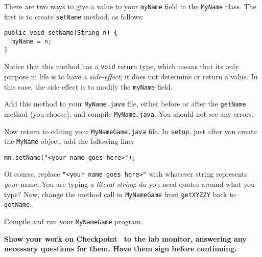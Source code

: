\documentclass[12pt,twoside]{memoir}
\newcommand\code[1]{\lstinline^#1^}
\newenvironment{Checkpoint}[1]{%
\begin{Exercise}[name={Checkpoint},title={#1}]}{%
\end{Exercise}%
\textbf{Show your work on Checkpoint~\theExercise{} to the lab monitor, %
  answering any necessary questions for them.  Have them sign before continuing.}}
\begin{document}
\begin{Checkpoint}{Setting your name.}
  There are two ways to give a value to your \code{myName} field in
  the \code{MyName} class.  The first is to create \code{setName}
  method, as follows:

\begin{lstlisting}
public void setName(String n) {
  myName = n;
}
\end{lstlisting}

Notice that this method has a \code{void} return type, which means
that its only purpose in life is to have a \emph{side-effect}; it does
not determine or return a value.  In this case, the side-effect is to
modify the \code{myName} field.

Add this method to your \code{MyName.java} file, either before or
after the \code{getName} method (you choose), and compile 
\code{MyName.java}.  You should not see any errors.

Now return to editing your \code{MyNameGame.java} file.  In
\code{setup}, just after you create the \code{MyName} object, add the
following line:

\begin{lstlisting}
mn.setName("<your name goes here>");
\end{lstlisting}


Of course, replace \code{"<your name goes here>"} with whatever string
represents \emph{your} name.  You are typing a \emph{literal string}:
do you need quotes around what you type? Now, change the method call
in \code{MyNameGame} from \code{getXYZZY} back to \code{getName}.

Compile and run your \code{MyNameGame} program.
\end{Checkpoint}
\end{document}
